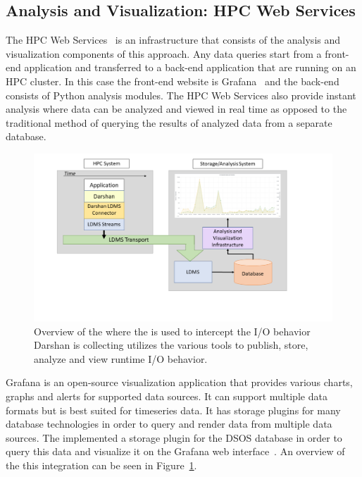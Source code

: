 \subsection{Analysis and Visualization: HPC Web Services}
The HPC Web Services~\cite{ClusterAV} is an infrastructure that consists of the analysis and visualization components of this approach. Any data queries start from a front-end application and transferred to a back-end application that are running on an HPC cluster. In this case the front-end website is Grafana~\cite{grafana-website} and the back-end consists of Python analysis modules. The HPC Web Services also provide instant analysis where data can be analyzed and viewed in real time as opposed to the traditional method of querying the results of analyzed data from a separate database.

\begin{figure}
	\centering
	\includegraphics[trim=3cm 2cm 0cm 0cm, clip,width=1.2\linewidth]{figs/darshan-integration.pdf}
	\caption{Overview of the \Darshan where the \connector is used to intercept the I/O behavior Darshan is collecting utilizes the various tools to publish, store, analyze and view runtime I/O behavior.}
	\label{f:FrameworkOverview}
\end{figure}

Grafana is an open-source visualization application that provides various charts, graphs and alerts for supported data sources. It can support multiple data formats but is best suited for timeseries data. It has storage plugins for many database technologies in order to query and render data from multiple data sources. The \Darshan implemented a storage plugin for the DSOS database in order to query this data and visualize it on the Grafana web interface~\cite{grafana-website}. An overview of the this integration can be seen in Figure~\ref{f:FrameworkOverview}.

